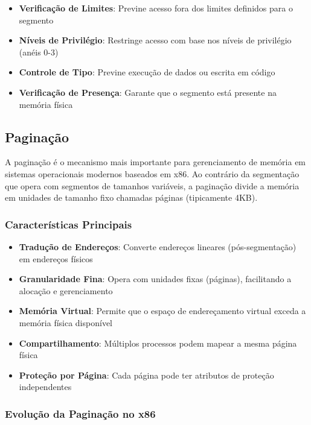 \begin{itemize}
    \item \textbf{Verificação de Limites}: Previne acesso fora dos limites definidos para o segmento
    \item \textbf{Níveis de Privilégio}: Restringe acesso com base nos níveis de privilégio (anéis 0-3)
    \item \textbf{Controle de Tipo}: Previne execução de dados ou escrita em código
    \item \textbf{Verificação de Presença}: Garante que o segmento está presente na memória física
\end{itemize}

\subsection{Paginação}
\label{subsec:paginacao_introducao}

A paginação é o mecanismo mais importante para gerenciamento de memória em sistemas operacionais modernos baseados em x86. Ao contrário da segmentação que opera com segmentos de tamanhos variáveis, a paginação divide a memória em unidades de tamanho fixo chamadas páginas (tipicamente 4KB).

\subsubsection{Características Principais}

\begin{itemize}
    \item \textbf{Tradução de Endereços}: Converte endereços lineares (pós-segmentação) em endereços físicos
    \item \textbf{Granularidade Fina}: Opera com unidades fixas (páginas), facilitando a alocação e gerenciamento
    \item \textbf{Memória Virtual}: Permite que o espaço de endereçamento virtual exceda a memória física disponível
    \item \textbf{Compartilhamento}: Múltiplos processos podem mapear a mesma página física
    \item \textbf{Proteção por Página}: Cada página pode ter atributos de proteção independentes
\end{itemize}

\subsubsection{Evolução da Paginação no x86}

